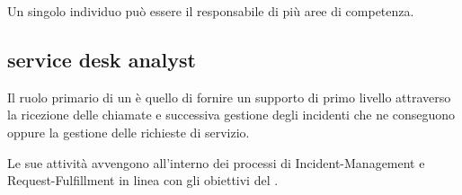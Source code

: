 Un singolo individuo può essere il responsabile di più aree di competenza.

\subsection[Service Desk Analyst]{service desk analyst}
\label{sd-sd-analyst}
Il ruolo primario di un  è quello di fornire un supporto di primo livello attraverso la ricezione delle chiamate e successiva gestione degli incidenti che ne conseguono oppure la gestione delle richieste di servizio.

Le sue attività avvengono all'interno dei processi di \acf{Incident-Management} e \acf{Request-Fulfillment} in linea con gli obiettivi del .